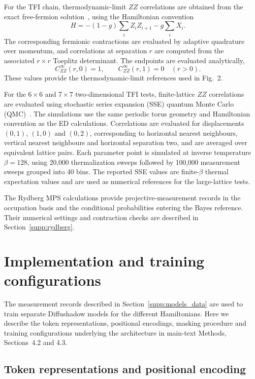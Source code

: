 \documentclass[11pt,a4paper]{article}
\newcommand{\sechead}[2]{\section{#2}}
\newcommand{\subhead}[1]{\subsection*{#1}}
\begin{document}
For the TFI chain, thermodynamic-limit $ZZ$ correlations are obtained
from the exact free-fermion solution~\cite{pfeuty1970one}, using
the Hamiltonian convention
\begin{equation}
H
=
-(1-g)\sum_i Z_iZ_{i+1}
-g\sum_i X_i .
\end{equation}
The corresponding fermionic contractions are evaluated by adaptive
quadrature over momentum, and correlations at separation $r$ are
computed from the associated $r\times r$ Toeplitz determinant.
The endpoints are evaluated analytically,
\begin{equation}
C_{ZZ}^{\infty}(r,0)=1,
\qquad
C_{ZZ}^{\infty}(r,1)=0
\quad (r>0).
\end{equation}
These values provide the thermodynamic-limit references used in
Fig.~2.

For the $6\times6$ and $7\times7$ two-dimensional TFI tests,
finite-lattice $ZZ$ correlations are evaluated using stochastic
series expansion (SSE) quantum Monte Carlo
(QMC)~\cite{sandvik2003stochastic}. The simulations use the same periodic
torus geometry and Hamiltonian convention as the ED calculations.
Correlations are evaluated for displacements $(0,1)$, $(1,0)$ and
$(0,2)$, corresponding to horizontal nearest neighbours, vertical
nearest neighbours and horizontal separation two, and are averaged
over equivalent lattice pairs. Each parameter point is simulated at
inverse temperature $\beta=128$, using 20,000 thermalization sweeps
followed by 100,000 measurement sweeps grouped into 40 bins. The
reported SSE values are finite-$\beta$ thermal expectation values
and are used as numerical references for the large-lattice tests.

The Rydberg MPS calculations provide projective-measurement records
in the occupation basis and the conditional probabilities entering
the Bayes reference. Their numerical settings and contraction checks
are described in Section~\ref{supp:rydberg}.



\sechead{S2}{Implementation and training configurations}
\label{sec:s2_implementation}

The measurement records described in Section~\ref{supp:models_data} are used to train
separate Diffushadow models for the different Hamiltonians. Here we
describe the token representations, positional encodings, masking
procedure and training configurations underlying the architecture in
main-text Methods, Sections~4.2 and 4.3.

\subhead{Token representations and positional encoding}
\end{document}
